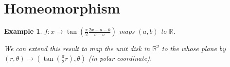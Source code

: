 \documentclass{article}
\DeclarePairedDelimiter\norm{\lVert}{\rVert}
\DeclarePairedDelimiter\abs{\lvert}{\rvert}
\DeclarePairedDelimiter\inner{\langle}{\rangle}
\newtheorem{example}{Example}[section] %
\newtheorem{lemma}{Lemma}[section]
\newtheorem{remark}{Remark}[section]
\begin{document}
\section{Homeomorphism}
\setcounter{example}{1}
\begin{example}
$f: x\to \tan(\frac{\pi}{2} \frac{2x-a-b}{b-a})$ maps $(a,b)$ to $\mathbb{R}$.

\normalfont
We can extend this result to map the unit disk in $\mathbb{R}^2$ to the whose plane by $(r,\theta)\to (\tan(\frac{\pi}{2}r),\theta)$ (in polar coordinate).
\end{example}
\end{document}
